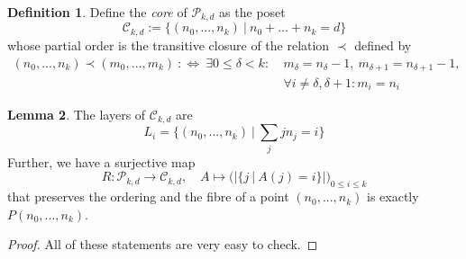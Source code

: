 \documentclass{scrartcl}
\theoremstyle{definition}
\newtheorem{definition}{Definition}
\newtheorem{lemma}[definition]{Lemma}
\begin{document}
\begin{definition}
    Define the \emph{core} of $\mathcal{P}_{k, d}$ as the poset
    \begin{equation*}
        \mathcal{C}_{k, d} := \{ (n_0, ..., n_k) \ | \ n_0 + ... + n_k = d \}
    \end{equation*}
    whose partial order is the transitive closure of the relation $\prec$ defined by
    \begin{align*}
        (n_0, ..., n_k) \prec (m_0, ..., m_k) \ :\Leftrightarrow \ \exists 0 \leq \delta < k: \ &m_\delta = n_\delta - 1, \ m_{\delta + 1} = n_{\delta + 1} - 1, \\
        &\forall i \neq \delta, \delta + 1: m_i = n_i 
    \end{align*}
\end{definition}
\begin{lemma}
    The layers of $\mathcal{C}_{k, d}$ are
    \begin{equation*}
        L_i = \{ (n_0, ..., n_k) \ | \ \sum_j j n_j = i \}
    \end{equation*}
    Further, we have a surjective map
    \begin{equation*}
        R: \mathcal{P}_{k, d} \to \mathcal{C}_{k, d}, \quad A \mapsto \bigl( |\{j \ | \ A(j) = i\}| \bigr)_{0 \leq i \leq k}
    \end{equation*}
    that preserves the ordering and the fibre of a point $(n_0, ..., n_k)$ is exactly $P(n_0, ..., n_k)$.
\end{lemma}
\begin{proof}
    All of these statements are very easy to check.
\end{proof}
\end{document}
